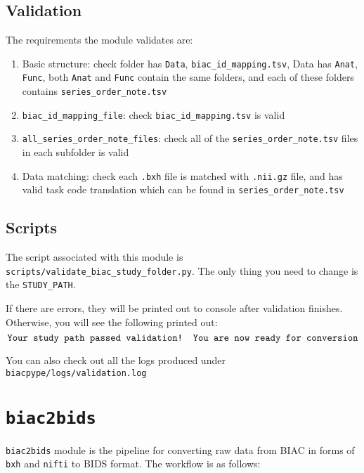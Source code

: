 \documentclass[12pt]{myland}
\def\<#1>{\texttt{#1}}
\begin{document}
    \subsection{Validation}

    The requirements the module validates are:
    \begin{enumerate}
        \item Basic structure: check folder has \<Data>, \<biac\_id\_mapping.tsv>, Data has \<Anat>, \<Func>, 
            both \<Anat> and \<Func> contain the same folders, and each of these folders contains \<series\_order\_note.tsv>
        \item \<biac\_id\_mapping\_file>: check \<biac\_id\_mapping.tsv> is valid 
        \item \<all\_series\_order\_note\_files>: check all of the \<series\_order\_note.tsv> files in each subfolder is valid 
        \item Data matching: check each \<.bxh> file is matched with \<.nii.gz> file, and has valid task code
            translation which can be found in \<series\_order\_note.tsv>
    \end{enumerate}

    \subsection{Scripts}
    The script associated with this module is \<scripts/validate\_biac\_study\_folder.py>. The only thing you 
    need to change is the \<STUDY\_PATH>. \par

    If there are errors, they will be printed out to console after validation finishes. Otherwise, you will 
    see the following printed out:
    \[\text{\<Your study path passed validation! You are now ready for conversion>}\]

    You can also check out all the logs produced under \<biacpype/logs/validation.log>

    

\section{\texttt{biac2bids}}

   \texttt{biac2bids} module is the pipeline for converting raw data from BIAC in forms of \texttt{bxh} and
   \texttt{nifti} to BIDS format. The workflow is as follows:
\end{document}
